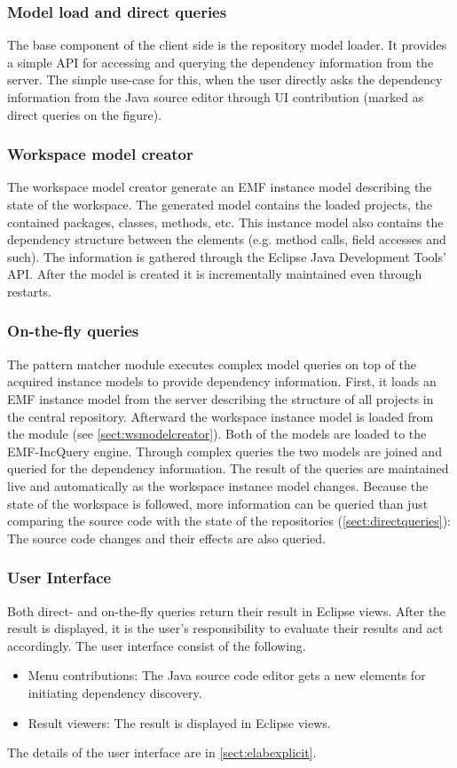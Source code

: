 \subsubsection{Model load and direct queries}\label{sect:directqueries}
The base component of the client side is the repository model loader. It
provides a simple API for accessing and querying the dependency information from
the server. The simple use-case for this, when the user directly asks the
dependency information from the Java source editor through UI contribution
(marked as direct queries on the figure).

\subsubsection{Workspace model creator}\label{sect:wsmodelcreator}
The workspace model creator generate an EMF instance model describing the
state of the workspace. The generated model contains the loaded projects, the
contained packages, classes, methods, etc. This instance model also contains the
dependency structure between the elements (e.g. method calls, field accesses and
such). The information is gathered through the Eclipse Java Development Tools'
API. After the model is created it is incrementally maintained even through 
restarts.

\subsubsection{On-the-fly queries}
The pattern matcher module executes complex model queries on top of the acquired
instance models to provide dependency information. First, it loads an EMF
instance model from the server describing the structure of all projects in the
central repository. Afterward the workspace instance model is loaded from the
module (see \autoref{sect:wsmodelcreator}). Both of the models are loaded to the
EMF-IncQuery engine. Through complex queries the two models are joined and
queried for the dependency information. The result of the queries are maintained
live and automatically as the workspace instance model changes. Because the
state of the workspace is followed, more information can be queried than just
comparing the source code with the state of the repositories
(\autoref{sect:directqueries}): The source code changes and their effects
are also queried.

\subsubsection{User Interface}
Both direct- and on-the-fly queries return their result in Eclipse views. After
the result is displayed, it is the user's responsibility to evaluate their
results and act accordingly. The user interface consist of the following.
\begin{itemize}
  \item Menu contributions: The Java source code editor gets a new elements for 
initiating dependency discovery.
  \item Result viewers: The result is displayed in Eclipse views.
\end{itemize}
The details of the user interface are in \autoref{sect:elabexplicit}.

